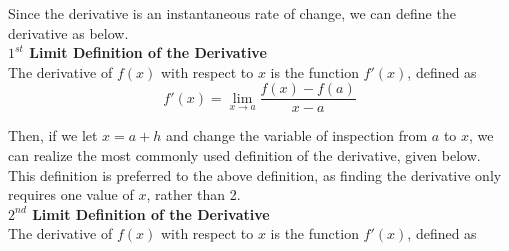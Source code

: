 \documentclass{article}
\begin{document}
            \begin{center}
            \end{center}

            \noindent Since the derivative is an instantaneous rate of change, we can define the
            derivative as below. \\
            \color{purple} \textbf{$1^{st}$ Limit Definition of the Derivative} \color{black} \\
            The derivative of $f(x)$ with respect to $x$ is the function $f'(x)$, defined as \\

            \begin{equation*}
                f'(x) = \lim_{x\to a} \frac{f(x)-f(a)}{x-a}
            \end{equation*}

            \noindent Then, if we let $x=a+h$ and change the variable of inspection from $a$ to $x$,
            we can realize the most commonly used definition of the derivative, given below. This
            definition is preferred to the above definition, as finding the derivative only requires
            one value of $x$, rather than 2.  \\
            \color{purple} \textbf{$2^{nd}$ Limit Definition of the Derivative} \color{black} \\
            The derivative of $f(x)$ with respect to $x$ is the function $f'(x)$, defined as \\
\end{document}
